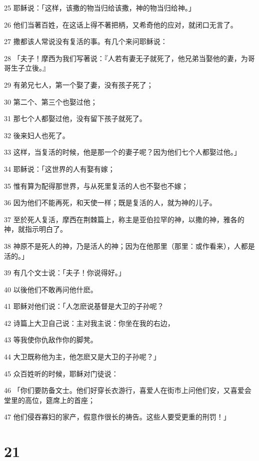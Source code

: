 \par 25 耶稣说：「这样，该撒的物当归给该撒，神的物当归给神。」
\par 26 他们当著百姓，在这话上得不著把柄，又希奇他的应对，就闭口无言了。
\par 27 撒都该人常说没有复活的事。有几个来问耶稣说：
\par 28 「夫子！摩西为我们写著说：『人若有妻无子就死了，他兄弟当娶他的妻，为哥哥生子立後。』
\par 29 有弟兄七人，第一个娶了妻，没有孩子死了；
\par 30 第二个、第三个也娶过他；
\par 31 那七个人都娶过他，没有留下孩子就死了。
\par 32 後来妇人也死了。
\par 33 这样，当复活的时候，他是那一个的妻子呢？因为他们七个人都娶过他。」
\par 34 耶稣说：「这世界的人有娶有嫁；
\par 35 惟有算为配得那世界，与从死里复活的人也不娶也不嫁；
\par 36 因为他们不能再死，和天使一样；既是复活的人，就为神的儿子。
\par 37 至於死人复活，摩西在荆棘篇上，称主是亚伯拉罕的神，以撒的神，雅各的神，就指示明白了。
\par 38 神原不是死人的神，乃是活人的神；因为在他那里（那里：或作看来），人都是活的。」
\par 39 有几个文士说：「夫子！你说得好。」
\par 40 以後他们不敢再问他什麽。
\par 41 耶稣对他们说：「人怎麽说基督是大卫的子孙呢？
\par 42 诗篇上大卫自己说：主对我主说：你坐在我的右边，
\par 43 等我使你仇敌作你的脚凳。
\par 44 大卫既称他为主，他怎麽又是大卫的子孙呢？」
\par 45 众百姓听的时候，耶稣对门徒说：
\par 46 「你们要防备文士。他们好穿长衣游行，喜爱人在街市上问他们安，又喜爱会堂里的高位，筵席上的首座；
\par 47 他们侵吞寡妇的家产，假意作很长的祷告。这些人要受更重的刑罚！」

\chapter{21}

